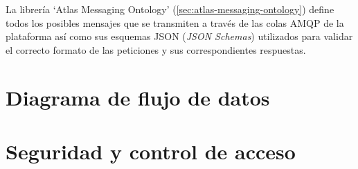 La librería `Atlas Messaging Ontology' (\ref{sec:atlas-messaging-ontology}) define todos los posibles mensajes que se transmiten a través de las colas AMQP de la plataforma así como sus esquemas JSON (\textit{JSON Schemas}) utilizados para validar el correcto formato de las peticiones y sus correspondientes respuestas.

\section{Diagrama de flujo de datos}


\section{Seguridad y control de acceso}
